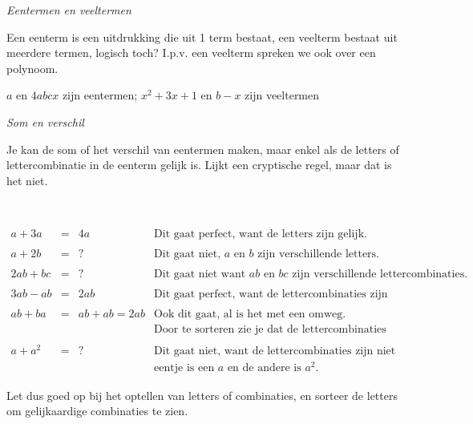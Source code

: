 	
	\emph{Eentermen en veeltermen}
	
	Een eenterm is een uitdrukking die uit 1 term bestaat, een veelterm
	bestaat uit meerdere termen, logisch toch? I.p.v. een veelterm spreken
	we ook over een polynoom.
	
	\begin{voorbeeld}
		$a$ en $4abcx$ zijn eentermen; $x^{2}+3x+1$ en $b-x$ zijn veeltermen
	\end{voorbeeld}
	
	\emph{Som en verschil}
	
	Je kan de som of het verschil van eentermen maken, maar enkel als
	de letters of lettercombinatie in de eenterm gelijk is. Lijkt een
	cryptische regel, maar dat is het niet. 
	
\begin{voorbeeld}
	\ \\
		\begin{center}
		\begin{equation*}
		\begin{array}{cccr}
		a+3a&=&4a &  \text{Dit gaat perfect, want de letters zijn gelijk.} \\
		&&&\\
		a+2b&=&?& \text{Dit gaat niet, $a$ en $b$ zijn verschillende
		letters.} \\
			&&&\\
		2ab+bc&=&?& \text{Dit gaat niet want $ab$ en $bc$ zijn verschillende
		lettercombinaties. }\\
			&&&\\
		3ab-ab&=&2ab& \text{Dit gaat perfect, want de lettercombinaties
		zijn gelijk.} \\
			&&&\\
		ab+ba&=&ab+ab=2ab & \text{Ook dit gaat, al is het met een omweg.} \\
		& & & \text{Door te sorteren zie je dat de lettercombinaties gelijk zijn.}\\
				&&&\\
		a+a^{2}&=&?& \text{Dit gaat niet, want de lettercombinaties zijn niet gelijk,}\\
		& & & \text{eentje is een $a$ en de andere is $a^{2}$.}
		\end{array}
		\end{equation*}
	\end{center}
\end{voorbeeld}
	
	Let dus goed op bij het optellen van letters of combinaties, en sorteer
	de letters om gelijkaardige combinaties te zien. 
	
